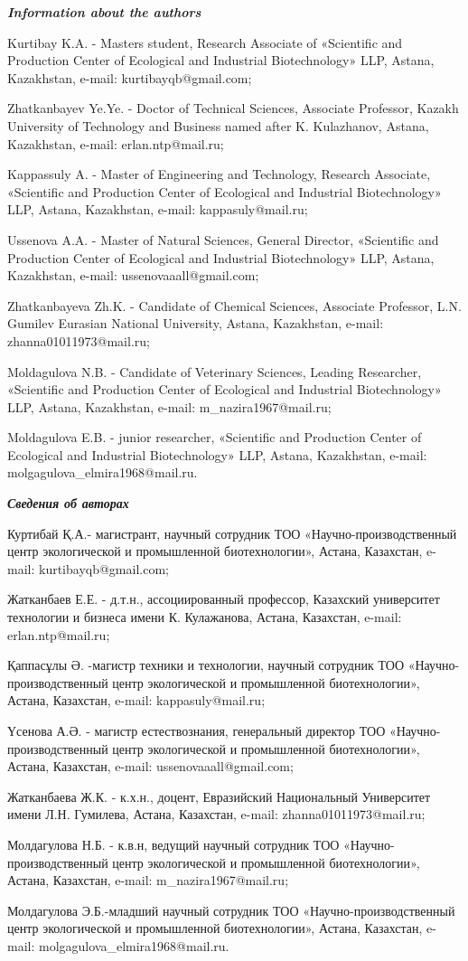 \emph{{\bfseries Information about the authors}}

Kurtibay K.A. - Master\textquotesingle s student, Research Associate of
«Scientific and Production Center of Ecological and Industrial
Biotechnology» LLP, Astana, Kazakhstan, e-mail: kurtibayqb@gmail.com;

Zhatkanbayev Ye.Ye. - Doctor of Technical Sciences, Associate Professor,
Kazakh University of Technology and Business named after K. Kulazhanov,
Astana, Kazakhstan, e-mail: erlan.ntp@mail.ru;

Kappassuly A. - Master of Engineering and Technology, Research
Associate, «Scientific and Production Center of Ecological and
Industrial Biotechnology» LLP, Astana, Kazakhstan, e-mail:
kappasuly@mail.ru;

Ussenova A.A. - Master of Natural Sciences, General Director,
«Scientific and Production Center of Ecological and Industrial
Biotechnology» LLP, Astana, Kazakhstan, e-mail: ussenovaaall@gmail.com;

Zhatkanbayeva Zh.K. - Candidate of Chemical Sciences, Associate
Professor, L.N. Gumilev Eurasian National University, Astana,
Kazakhstan, e-mail: zhanna01011973@mail.ru;

Moldagulova N.B. - Candidate of Veterinary Sciences, Leading Researcher,
«Scientific and Production Center of Ecological and Industrial
Biotechnology» LLP, Astana, Kazakhstan, e-mail: m\_nazira1967@mail.ru;

Moldagulova E.B. - junior researcher, «Scientific and Production Center
of Ecological and Industrial Biotechnology» LLP, Astana, Kazakhstan,
e-mail: molgagulova\_elmira1968@mail.ru.

\emph{{\bfseries Сведения об авторах}}

Куртибай Қ.А.- магистрант, научный сотрудник ТОО
«Научно-производственный центр экологической и промышленной
биотехнологии», Астана, Казахстан, e-mail: kurtibayqb@gmail.com;

Жатканбаев Е.Е. - д.т.н., ассоциированный профессор, Казахский
университет технологии и бизнеса имени К. Кулажанова, Астана, Казахстан,
e-mail: erlan.ntp@mail.ru;

Қаппасұлы Ә. -магистр техники и технологии, научный сотрудник ТОО
«Научно-производственный центр экологической и промышленной
биотехнологии», Астана, Казахстан, e-mail: kappasuly@mail.ru;

Үсенова А.Ә. - магистр естествознания, генеральный директор ТОО
«Научно-производственный центр экологической и промышленной
биотехнологии», Астана, Казахстан, e-mail: ussenovaaall@gmail.com;

Жатканбаева Ж.К. - к.х.н., доцент, Евразийский Национальный Университет
имени Л.Н. Гумилева, Астана, Казахстан, e-mail: zhanna01011973@mail.ru;

Молдагулова Н.Б. - к.в.н, ведущий научный сотрудник ТОО
«Научно-производственный центр экологической и промышленной
биотехнологии», Астана, Казахстан, e-mail: m\_nazira1967@mail.ru;

Молдагулова Э.Б.-младший научный сотрудник ТОО «Научно-производственный
центр экологической и промышленной биотехнологии», Астана, Казахстан,
e-mail: molgagulova\_elmira1968@mail.ru.
